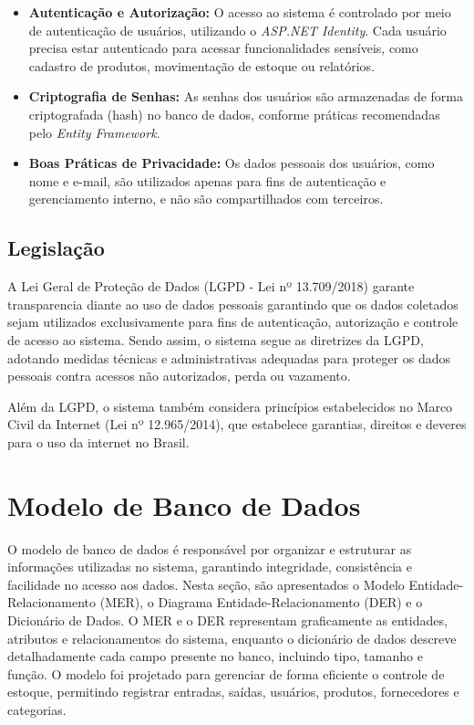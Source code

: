 \documentclass[
	12pt,				%
	openany,			%
	twoside,			%
	a4paper,			%
	english,			%
	brazil				%
	]{abntex2}
\begin{document}
\begin{itemize}
    \item \textbf{Autenticação e Autorização:} O acesso ao sistema é controlado por meio de autenticação de usuários, utilizando o \textit{ASP.NET Identity}. Cada usuário precisa estar autenticado para acessar funcionalidades sensíveis, como cadastro de produtos, movimentação de estoque ou relatórios.

    \item \textbf{Criptografia de Senhas:} As senhas dos usuários são armazenadas de forma criptografada (hash) no banco de dados, conforme práticas recomendadas pelo \textit{Entity Framework}.

    \item \textbf{Boas Práticas de Privacidade:} Os dados pessoais dos usuários, como nome e e-mail, são utilizados apenas para fins de autenticação e gerenciamento interno, e não são compartilhados com terceiros.
\end{itemize}

\subsection{Legislação}

A  Lei Geral de Proteção de Dados (LGPD - Lei nº 13.709/2018) garante transparencia diante ao uso de dados pessoais garantindo que os dados coletados sejam utilizados exclusivamente para fins de autenticação, autorização e controle de acesso ao sistema. Sendo assim, o sistema segue as diretrizes da LGPD, adotando medidas técnicas e administrativas adequadas para proteger os dados pessoais contra acessos não autorizados, perda ou vazamento. 

Além da LGPD, o sistema também considera princípios estabelecidos no Marco Civil da Internet (Lei nº 12.965/2014), que estabelece garantias, direitos e deveres para o uso da internet no Brasil.




\section{Modelo de Banco de Dados}

O modelo de banco de dados é responsável por organizar e estruturar as informações utilizadas no sistema, garantindo integridade, consistência e facilidade no acesso aos dados. Nesta seção, são apresentados o Modelo Entidade-Relacionamento (MER), o Diagrama Entidade-Relacionamento (DER) e o Dicionário de Dados. O MER e o DER representam graficamente as entidades, atributos e relacionamentos do sistema, enquanto o dicionário de dados descreve detalhadamente cada campo presente no banco, incluindo tipo, tamanho e função. O modelo foi projetado para gerenciar de forma eficiente o controle de estoque, permitindo registrar entradas, saídas, usuários, produtos, fornecedores e categorias.
\end{document}

